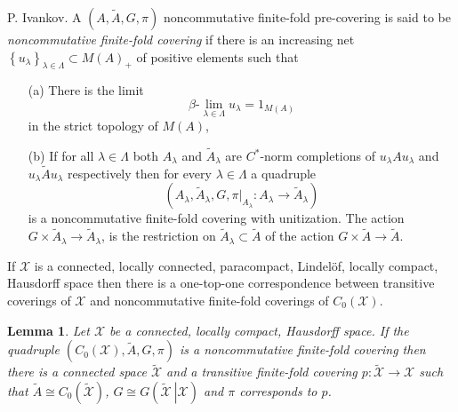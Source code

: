 \documentclass{beamer}
\theoremstyle{plain}
\newtheorem{lem}{Lemma}%
\newcommand{\sX}{\mathcal{X}}       %
\begin{document}
\begin{frame}
\begin{definition}
	\alert{P. Ivankov}.	A $\left(A, \widetilde{A}, G, \pi \right)$  noncommutative finite-fold  pre-covering is said to be   \textit{noncommutative finite-fold covering} if there is an increasing net $\left\{u_\lambda\right\}_{\lambda\in\Lambda}\subset M\left( A\right)_+ $  of positive elements such that
	\begin{enumerate}
		\item[(a)] There is the limit 
		$$
		\beta\text{-}\lim_{\lambda \in \Lambda} u_\lambda = 1_{M\left(A \right) }
		$$
		in the strict topology of $M\left(A \right)$,
		\item[(b)]  If for all   $\lambda\in\Lambda$ both $A_\lambda$ and  $\widetilde A_\lambda$ are $C^*$-norm completions  of $u_\lambda A u_\lambda$ and  $u_\lambda\widetilde{A}u_\lambda$ respectively then for every $\lambda\in\Lambda$ a quadruple
		$$
		\left(A_\lambda, \widetilde{A}_\lambda, G, \left.\pi\right|_{A_\lambda} :A_\lambda\to \widetilde{A}_\lambda\right)	
		$$
		is a noncommutative finite-fold covering with unitization. The action 	$G \times \widetilde{A}_\lambda\to \widetilde{A}_\lambda$, is the restriction on $\widetilde{A}_\lambda\subset \widetilde{   A}$ of the action $G\times  \widetilde{A}\to \widetilde{A}$.
	\end{enumerate}
	
\end{definition}
\end{frame}
\begin{frame}

\begin{theorem}
If $\mathcal X$ is a connected, locally connected, paracompact, Lindel\"{o}f, locally compact, Hausdorff space then there is a one-top-one correspondence between transitive coverings of  $\mathcal X$ and noncommutative finite-fold coverings of $C_0\left( \mathcal X\right)$. 
\end{theorem}

	\begin{lem}
		Let $\mathcal X$ be a connected, locally compact, Hausdorff space.
		If the  quadruple $\left(C_0\left(\mathcal  X \right), \widetilde{A}, G,    \pi\right)$ is a noncommutative finite-fold covering then there is a connected space $\widetilde{   \mathcal X }$ and a transitive finite-fold covering  $p: \widetilde{   \mathcal X } \to \sX$ such that $\widetilde{A} \cong C_0\left( \widetilde{   \mathcal X }\right)$, $G \cong G\left(\left. \widetilde{   \mathcal X } ~\right| {   \mathcal X }\right)$ and $\pi$ corresponds to $p$.
	\end{lem}
\end{frame}
\end{document}
